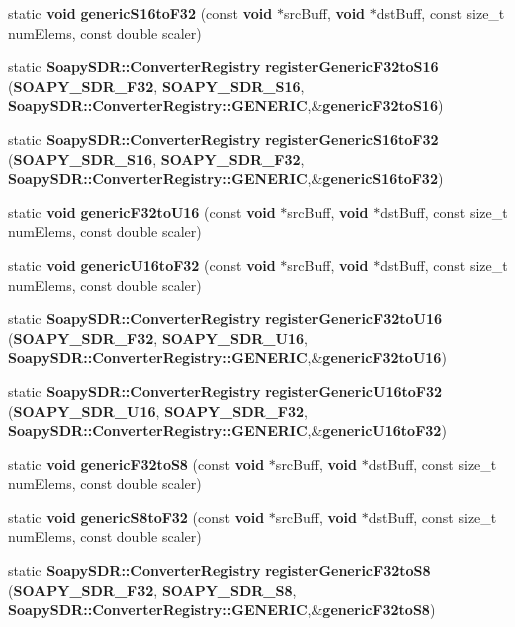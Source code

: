 \begin{DoxyCompactItemize}
static {\bf void} {\bf generic\+S16to\+F32} (const {\bf void} $\ast$src\+Buff, {\bf void} $\ast$dst\+Buff, const size\+\_\+t num\+Elems, const double scaler)
\item 
static {\bf Soapy\+S\+D\+R\+::\+Converter\+Registry} {\bf register\+Generic\+F32to\+S16} ({\bf S\+O\+A\+P\+Y\+\_\+\+S\+D\+R\+\_\+\+F32}, {\bf S\+O\+A\+P\+Y\+\_\+\+S\+D\+R\+\_\+\+S16}, {\bf Soapy\+S\+D\+R\+::\+Converter\+Registry\+::\+G\+E\+N\+E\+R\+IC},\&{\bf generic\+F32to\+S16})
\item 
static {\bf Soapy\+S\+D\+R\+::\+Converter\+Registry} {\bf register\+Generic\+S16to\+F32} ({\bf S\+O\+A\+P\+Y\+\_\+\+S\+D\+R\+\_\+\+S16}, {\bf S\+O\+A\+P\+Y\+\_\+\+S\+D\+R\+\_\+\+F32}, {\bf Soapy\+S\+D\+R\+::\+Converter\+Registry\+::\+G\+E\+N\+E\+R\+IC},\&{\bf generic\+S16to\+F32})
\item 
static {\bf void} {\bf generic\+F32to\+U16} (const {\bf void} $\ast$src\+Buff, {\bf void} $\ast$dst\+Buff, const size\+\_\+t num\+Elems, const double scaler)
\item 
static {\bf void} {\bf generic\+U16to\+F32} (const {\bf void} $\ast$src\+Buff, {\bf void} $\ast$dst\+Buff, const size\+\_\+t num\+Elems, const double scaler)
\item 
static {\bf Soapy\+S\+D\+R\+::\+Converter\+Registry} {\bf register\+Generic\+F32to\+U16} ({\bf S\+O\+A\+P\+Y\+\_\+\+S\+D\+R\+\_\+\+F32}, {\bf S\+O\+A\+P\+Y\+\_\+\+S\+D\+R\+\_\+\+U16}, {\bf Soapy\+S\+D\+R\+::\+Converter\+Registry\+::\+G\+E\+N\+E\+R\+IC},\&{\bf generic\+F32to\+U16})
\item 
static {\bf Soapy\+S\+D\+R\+::\+Converter\+Registry} {\bf register\+Generic\+U16to\+F32} ({\bf S\+O\+A\+P\+Y\+\_\+\+S\+D\+R\+\_\+\+U16}, {\bf S\+O\+A\+P\+Y\+\_\+\+S\+D\+R\+\_\+\+F32}, {\bf Soapy\+S\+D\+R\+::\+Converter\+Registry\+::\+G\+E\+N\+E\+R\+IC},\&{\bf generic\+U16to\+F32})
\item 
static {\bf void} {\bf generic\+F32to\+S8} (const {\bf void} $\ast$src\+Buff, {\bf void} $\ast$dst\+Buff, const size\+\_\+t num\+Elems, const double scaler)
\item 
static {\bf void} {\bf generic\+S8to\+F32} (const {\bf void} $\ast$src\+Buff, {\bf void} $\ast$dst\+Buff, const size\+\_\+t num\+Elems, const double scaler)
\item 
static {\bf Soapy\+S\+D\+R\+::\+Converter\+Registry} {\bf register\+Generic\+F32to\+S8} ({\bf S\+O\+A\+P\+Y\+\_\+\+S\+D\+R\+\_\+\+F32}, {\bf S\+O\+A\+P\+Y\+\_\+\+S\+D\+R\+\_\+\+S8}, {\bf Soapy\+S\+D\+R\+::\+Converter\+Registry\+::\+G\+E\+N\+E\+R\+IC},\&{\bf generic\+F32to\+S8})

\end{DoxyCompactItemize}
